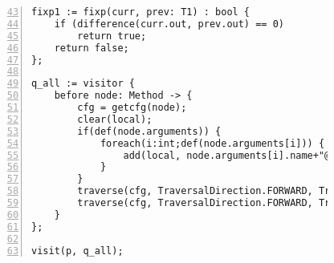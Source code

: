 \begin{figure}[ht!]
\begin{lstlisting}[numbers=left, tabsize=4, caption={Local must not alias},label={lst:lmna-code}, firstline = 43, firstnumber = 43, lastline = 91]
fixp1 := fixp(curr, prev: T1) : bool {
	if (difference(curr.out, prev.out) == 0)
		return true;	
	return false;
};

q_all := visitor {
	before node: Method -> {
		cfg = getcfg(node);
		clear(local);
		if(def(node.arguments)) {
			foreach(i:int;def(node.arguments[i])) {
				add(local, node.arguments[i].name+"@argument"+string(i));
			}
		}
		traverse(cfg, TraversalDirection.FORWARD, TraversalKind.HYBRID, init);
		traverse(cfg, TraversalDirection.FORWARD, TraversalKind.HYBRID, alias, fixp1);
	}
};

visit(p, q_all);
\end{lstlisting}
\end{figure}